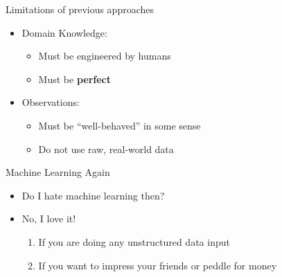\documentclass[usenames,dvipsnames]{beamer}
\begin{document}
\begin{frame}[c]{Limitations of previous approaches}
	\begin{itemize}
		\item Domain Knowledge:
		\begin{itemize}
			\item Must be engineered by humans
			\item Must be \textbf{perfect}
		\end{itemize}
		\item Observations:
		\begin{itemize}
			\item Must be ``well-behaved'' in some sense
			\item Do not use raw, real-world data
		\end{itemize}
	\end{itemize}
\end{frame}


{
%
\begin{frame}[b]{Machine Learning Again}
	\begin{itemize} \Large
		\item \color{white} Do I hate machine learning then?
		\item<2-> No, I love it! 
		\begin{enumerate} \color{white} \large
			\item<3-> If you are doing any unstructured data input
			\item<4-> If you want to impress your friends or peddle for money
		\end{enumerate}
	\end{itemize}
	\vspace*{3em}
\end{frame}
}
\end{document}
